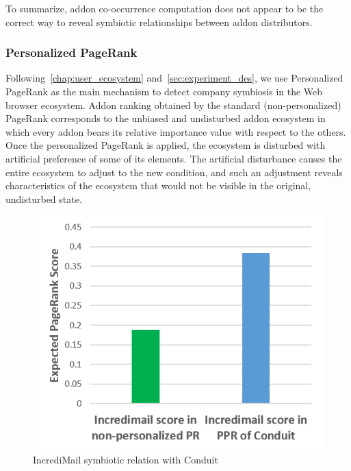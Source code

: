 \documentclass[ijoc,nonblindrev]{informs3} %
\numberwithin{equation}{subsection}
\begin{document}
To summarize, addon co-occurrence computation does not appear to be the correct way to reveal symbiotic relationships between addon distributors.

\subsubsection{Personalized PageRank}

Following~\autoref{chap:user_ecosystem} and~\autoref{sec:experiment_des}, we use Personalized PageRank as the main mechanism to detect company symbiosis in the Web browser ecosystem. Addon ranking obtained by the standard (non-personalized) PageRank corresponds to the unbiased and undisturbed addon ecosystem in which every addon bears its relative importance value with respect to the others. Once the personalized PageRank is applied, the ecosystem is disturbed with artificial preference of some of its elements. The artificial disturbance causes the entire ecosystem to adjust to the new condition, and such an adjustment reveals characteristics of the ecosystem that would not be visible in the original, undisturbed state. 

\iffalse
\begin{figure}[!htbp]
\centering
\includegraphics[width=\linewidth]{figures/incredi_sym_conduit.png}
\caption{IncrediMail symbiotic relation with Conduit}
\label{fig:incredimail_sym_conduit}
\end{figure}
\end{document}
